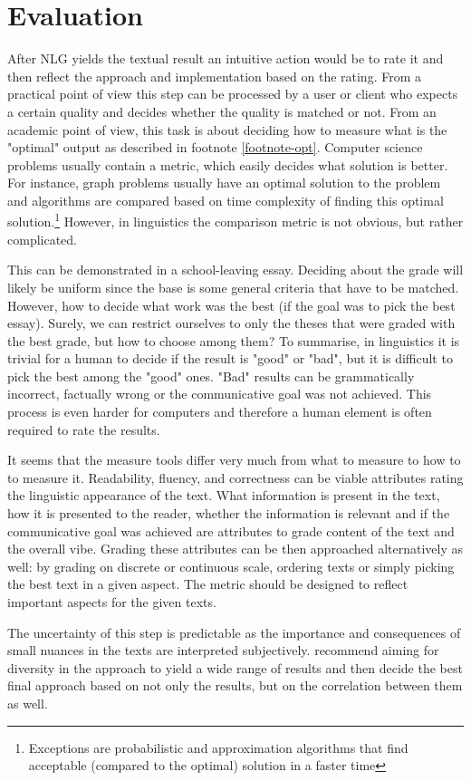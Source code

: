 \section{Evaluation}
After NLG yields the textual result an intuitive action would be to rate it and then reflect the approach and implementation based on the rating. From a practical point of view this step can be processed by a user or client who expects a certain quality and decides whether the quality is matched or not. From an academic point of view, this task is about deciding how to measure what is the "optimal" output as described in footnote \ref{footnote-opt}. Computer science problems usually contain a metric, which easily decides what solution is better. For instance, graph problems usually have an optimal solution to the problem and algorithms are compared based on time complexity of finding this optimal solution.\footnote{Exceptions are probabilistic and approximation algorithms that find acceptable (compared to the optimal) solution in a faster time} However, in linguistics the comparison metric is not obvious, but rather complicated.

This can be demonstrated in a school-leaving essay. Deciding about the grade will likely be uniform since the base is some general criteria that have to be matched. However, how to decide what work was the best (if the goal was to pick the best essay). Surely, we can restrict ourselves to only the theses that were graded with the best grade, but how to choose among them? To summarise, in linguistics it is trivial for a human to decide if the result is "good" or "bad", but it is difficult to pick the best among the "good" ones. "Bad" results can be grammatically incorrect, factually wrong or the communicative goal was not achieved. This process is even harder for computers and therefore a human element is often required to rate the results. 

It seems that the measure tools differ very much from what to measure to how to to measure it. Readability, fluency, and correctness can be viable attributes rating the linguistic appearance of the text. What information is present in the text, how it is presented to the reader, whether the information is relevant and if the communicative goal was achieved are attributes to grade content of the text and the overall vibe. Grading these attributes can be then approached alternatively as well: by grading on discrete or continuous scale, ordering texts or simply picking the best text in a given aspect. The metric should be designed to reflect important aspects for the given texts.

The uncertainty of this step is predictable as the importance and consequences of small nuances in the texts are interpreted subjectively. \cite{gatt2018survey} recommend aiming for diversity in the approach to yield a wide range of results and then decide the best final approach based on not only the results, but on the correlation between them as well.

